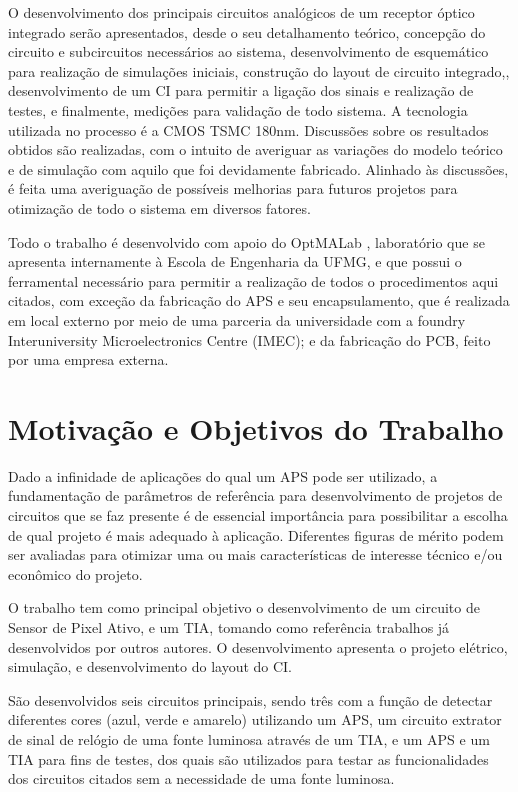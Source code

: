 O desenvolvimento dos principais circuitos analógicos de um receptor óptico integrado serão apresentados, desde o seu detalhamento teórico, concepção do circuito e subcircuitos necessários ao sistema, desenvolvimento de esquemático para realização de simulações iniciais, construção do layout de circuito integrado,, desenvolvimento de um CI para permitir a ligação dos sinais e realização de testes, e finalmente, medições para validação de todo sistema. A tecnologia utilizada no processo é a CMOS TSMC 180nm.
Discussões sobre os resultados obtidos são realizadas, com o intuito de averiguar as variações do modelo teórico e de simulação com aquilo que foi devidamente fabricado. Alinhado às discussões, é feita uma averiguação de possíveis melhorias para futuros projetos para otimização de todo o sistema em diversos fatores.

Todo o trabalho é desenvolvido com apoio do OptMALab , laboratório que se apresenta internamente à Escola de Engenharia da UFMG, e que possui o ferramental necessário para permitir a realização de todos o procedimentos aqui citados, com exceção da fabricação do APS e seu encapsulamento, que é realizada em local externo por meio de uma parceria da universidade com a foundry Interuniversity Microelectronics Centre (IMEC); e da fabricação do PCB, feito por uma empresa externa.

\section{Motivação e Objetivos do Trabalho}

Dado a infinidade de aplicações do qual um APS pode ser utilizado, a fundamentação de parâmetros de referência para desenvolvimento de projetos de circuitos que se faz presente é de essencial importância para possibilitar a escolha de qual projeto é mais adequado à aplicação. Diferentes figuras de mérito podem ser avaliadas para otimizar uma ou mais características de interesse técnico e/ou econômico do projeto.

O trabalho tem como principal objetivo o desenvolvimento de um circuito de Sensor de Pixel Ativo, e um TIA, tomando como referência trabalhos j\'a desenvolvidos por outros autores. O desenvolvimento apresenta o projeto elétrico, simulação, e desenvolvimento do layout do CI. 

São desenvolvidos seis circuitos principais, sendo três com a função de detectar diferentes cores (azul, verde e amarelo) utilizando um APS, um circuito extrator de sinal de relógio de uma fonte luminosa atrav\'es de um TIA, e um APS e um TIA para fins de testes, dos quais s\~ao utilizados para testar as funcionalidades dos circuitos citados sem a necessidade de uma fonte luminosa. 

